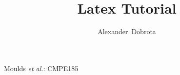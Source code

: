\documentclass[12pt,journal,compsoc]{IEEEtran}
\begin{document}

\title{Latex Tutorial}
\author{Alexander~Dobrota}

\date{}		%

%
{Moulds \MakeLowercase{\textit{et al.}}: CMPE185}
% 

\end{document}
